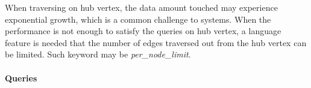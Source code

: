 
When traversing on hub vertex, the data amount touched may experience
exponential growth, which is a common challenge to systems. When the performance
is not enough to satisfy the queries on hub vertex, a language feature is needed
that the number of edges traversed out from the hub vertex can be limited. Such
keyword may be \emph{per\_node\_limit}.


\paragraph{Queries}
{\raggedright
}